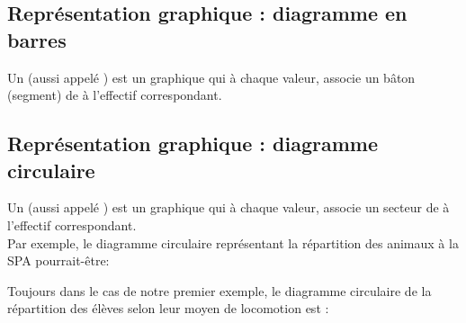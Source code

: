 \subsection{Représentation graphique : diagramme en barres}
\begin{definitionbox}
    Un  (aussi appelé ) est un
    graphique qui à chaque valeur, associe un bâton (segment) de
     à l'effectif correspondant.
\end{definitionbox}

\begin{center}
\end{center}


\subsection{Représentation graphique : diagramme circulaire}
\begin{definitionbox}
    Un  (aussi appelé ) est un
    graphique qui à chaque valeur, associe un secteur de
     à l'effectif correspondant. \\

    Par exemple, le diagramme circulaire représentant la répartition des animaux à la SPA pourrait-être:

    \begin{center}
    \end{center}


\end{definitionbox}
\begin{exempleboxsuite}
    Toujours dans le cas de notre premier exemple, le diagramme circulaire de la
    répartition des élèves selon leur moyen de locomotion est : 
    \begin{center}
    \end{center}

\end{exempleboxsuite}


